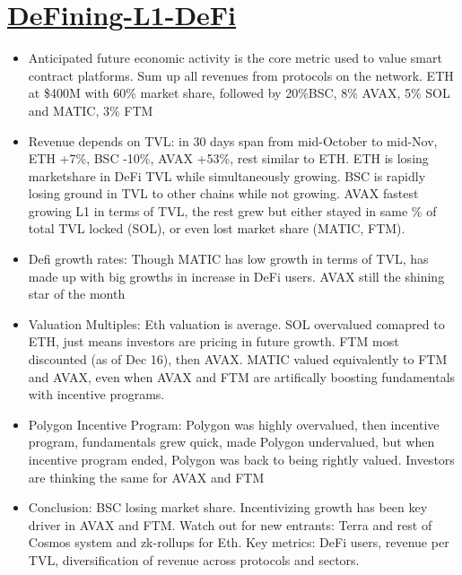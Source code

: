 \documentclass{../../notes}
\begin{document}
\section{\href{run:./defining-l1-defi.pdf}{DeFining-L1-DeFi}}
\begin{itemize}
    \item Anticipated future economic activity is the core metric used to value smart contract platforms. Sum up all revenues from protocols on the network. ETH at \$400M with 60\% market share, followed by 20\%BSC, 8\% AVAX, 5\% SOL and MATIC, 3\% FTM
    \item Revenue depends on TVL: in 30 days span from mid-October to mid-Nov, ETH +7\%, BSC -10\%, AVAX +53\%, rest similar to ETH. ETH is losing marketshare in DeFi TVL while simultaneously growing. BSC is rapidly losing ground in TVL to other chains while not growing. AVAX fastest growing L1 in terms of TVL, the rest grew but either stayed in same \% of total TVL locked (SOL), or even lost market share (MATIC, FTM). 
    \item Defi growth rates: Though MATIC has low growth in terms of TVL, has made up with big growths in increase in DeFi users. AVAX still the shining star of the month
    \item Valuation Multiples: Eth valuation is average. SOL overvalued comapred to ETH, just means investors are pricing in future growth. FTM most discounted (as of Dec 16), then AVAX. MATIC valued equivalently to FTM and AVAX, even when AVAX and FTM are artifically boosting fundamentals with incentive programs. 
    \item Polygon Incentive Program: Polygon was highly overvalued, then incentive program, fundamentals grew quick, made Polygon undervalued, but when incentive program ended, Polygon was back to being rightly valued. Investors are thinking the same for AVAX and FTM
    \item Conclusion: BSC losing market share. Incentivizing growth has been key driver in AVAX and FTM. Watch out for new entrants: Terra and rest of Cosmos system and zk-rollups for Eth. Key metrics: DeFi users, revenue per TVL, diversification of revenue across protocols and sectors. 
\end{itemize}
\end{document}
